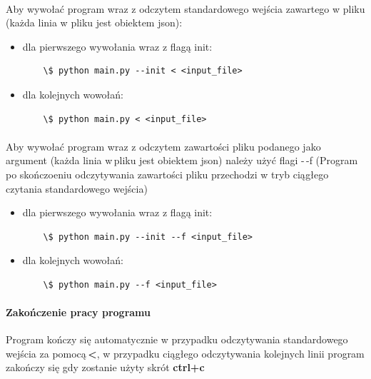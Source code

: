 \documentclass{article}
\begin{document}
\paragraph{}  
Aby wywołać program wraz z odczytem standardowego wejścia zawartego w pliku (każda linia w\,\,pliku jest obiektem json):
\begin{itemize}
\item dla pierwszego wywołania wraz z flagą init:
\begin{verbatim}
    \$ python main.py --init < <input_file>
\end{verbatim}
\item dla kolejnych wowołań:
\begin{verbatim}
    \$ python main.py < <input_file>
\end{verbatim}
\end{itemize}

\paragraph{}  
Aby wywołać program wraz z odczytem zawartości pliku podanego jako argument (każda linia w\,pliku jest obiektem json) należy użyć flagi -\,-f \newline
(Program po skończoeniu odczytywania zawartości pliku przechodzi w tryb ciągłego czytania standardowego wejścia)
\begin{itemize}
\item dla pierwszego wywołania wraz z flagą init:
\begin{verbatim}
    \$ python main.py --init --f <input_file>
\end{verbatim}
\item dla kolejnych wowołań:
\begin{verbatim}
    \$ python main.py --f <input_file>
\end{verbatim}
\end{itemize}

\paragraph{Zakończenie pracy programu \newline}  
Program kończy się automatycznie w przypadku odczytywania standardowego wejścia za pomocą\,\textbf{<},
w przypadku ciągłego odczytywania kolejnych linii program zakończy się gdy zostanie użyty skrót \textbf{ctrl+c}
\end{document}
